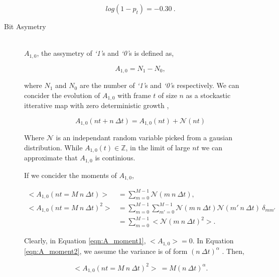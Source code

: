 \begin{description}
					\begin{equation}
						log(1 - p_t) = -0.30\ .
						\label{eqn:log_chain_length_gradient}			
					\end{equation}

				\item[Bit Asymetry] \hfill \\
					
					$A_{1,0}$, the assymetry of \textit{`1'}s and \textit{`0'}s is defined as,

					\begin{equation}
						A_{1,0} = N_1 - N_0,
						\label{eqn:a_def}
					\end{equation}

					where $N_1$ and $N_0$ are the number of \textit{`1'}s and \textit{`0'}s respectively.
					We can concider the evolution of $A_{1,0}$ with frame $t$ of size $n$ as a stockastic itterative map with zero deterministic growth \cite{ref:stockastic_physics},

					\begin{equation}
						A_{1,0}(nt + n\ \Delta t) = A_{1,0}(nt) + \mathcal{N}(nt)
					\end{equation}

					Where $\mathcal{N}$ is an independant random variable picked from a gausian distribution. While $A_{1,0}(t) \in \mathbb{Z}$, in the limit of large $nt$ we can approximate that $A_{1,0}$ is continious. 
					\par
					If we concider the moments of $A_{1,0}$,

					\begin{align}
						\label{eqn:A_moment1}
						<A_{1,0}(nt = M\ n\ \Delta t)> & = \sum_{m = 0}^{M -1}  \mathcal{N}(m\ n\ \Delta t), \\
						\label{eqn:A_moment2}
						<A_{1,0}(nt = M\ n\ \Delta t)^2> & = \sum_{m=0}^{M-1} \sum_{m'=0}^{M-1}  \mathcal{N}(m\ n\ \Delta t) \mathcal{N}(m'\ n\ \Delta t)\ \delta_{mm'} \nonumber \\
						&= \sum_{m=0}^{M-1} < \mathcal{N}(m\ n\ \Delta t)^2 >.
					\end{align}

					Clearly, in Equation \ref{eqn:A_moment1}, $<A_{1,0}> = 0$. In Equation \ref{eqn:A_moment2}, we assume the variance is of form $(n\ \Delta t)^\alpha$ \cite{ref:stockastic_physics}. Then,

					\begin{equation}
						<A_{1,0}(nt = M\ n\ \Delta t)^2>\ = M (n\ \Delta t)^\alpha.
						\label{eqn:A_moment3}
					\end{equation}


\end{description}
